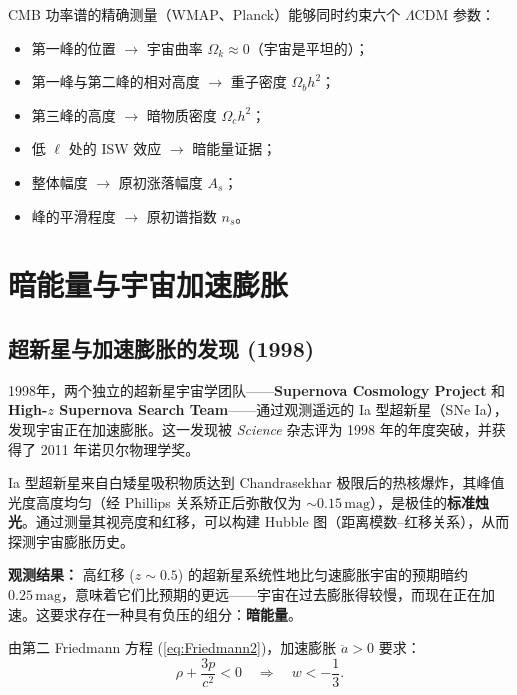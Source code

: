 \begin{note}
CMB 功率谱的精确测量（WMAP、Planck）能够同时约束六个 $\Lambda$CDM 参数：
\begin{itemize}
    \item 第一峰的位置 $\to$ 宇宙曲率 $\Omega_k \approx 0$（宇宙是平坦的）；
    \item 第一峰与第二峰的相对高度 $\to$ 重子密度 $\Omega_b h^2$；
    \item 第三峰的高度 $\to$ 暗物质密度 $\Omega_c h^2$；
    \item 低 $\ell$ 处的 ISW 效应 $\to$ 暗能量证据；
    \item 整体幅度 $\to$ 原初涨落幅度 $A_s$；
    \item 峰的平滑程度 $\to$ 原初谱指数 $n_s$。
\end{itemize}
\end{note}

\section{暗能量与宇宙加速膨胀}
\label{sec:dark_energy}

\subsection{超新星与加速膨胀的发现 (1998)}

1998年，两个独立的超新星宇宙学团队——\textbf{Supernova Cosmology Project} 和 \textbf{High-$z$ Supernova Search Team}——通过观测遥远的 Ia 型超新星（SNe Ia），发现宇宙正在加速膨胀。这一发现被 \textit{Science} 杂志评为 1998 年的年度突破，并获得了 2011 年诺贝尔物理学奖。

\begin{example}
Ia 型超新星来自白矮星吸积物质达到 Chandrasekhar 极限后的热核爆炸，其峰值光度高度均匀（经 Phillips 关系矫正后弥散仅为 $\sim 0.15\,\text{mag}$），是极佳的\textbf{标准烛光}。通过测量其视亮度和红移，可以构建 Hubble 图（距离模数--红移关系），从而探测宇宙膨胀历史。
\end{example}

\textbf{观测结果：} 高红移 ($z \sim 0.5$) 的超新星系统性地比匀速膨胀宇宙的预期暗约 $0.25\,\text{mag}$，意味着它们比预期的更远——宇宙在过去膨胀得较慢，而现在正在加速。这要求存在一种具有负压的组分：\textbf{暗能量}。

\begin{theorem}[加速膨胀的条件]
由第二 Friedmann 方程 (\ref{eq:Friedmann2})，加速膨胀 $\ddot{a} > 0$ 要求：
\begin{equation}
    \rho + \frac{3p}{c^2} < 0
    \quad\Longrightarrow\quad
    \boxed{w < -\frac{1}{3}}.
    \label{eq:acceleration_condition}
\end{equation}
\end{theorem}


